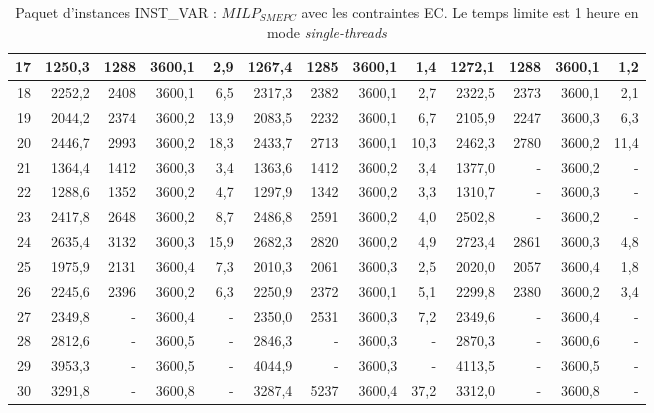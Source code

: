 {\begin{table}[H]
\begin{tabular}{|r|rrrr|rrrr|rrrr|}
		17	&	1250,3	&	1288	&	3600,1	&	2,9	&	1267,4	&	1285	&	3600,1	&	1,4	&	1272,1	&	1288	&	3600,1	&	1,2	\\ \hline
		18	&	2252,2	&	2408	&	3600,1	&	6,5	&	2317,3	&	2382	&	3600,1	&	2,7	&	2322,5	&	2373	&	3600,1	&	2,1	\\ \hline
		19	&	2044,2	&	2374	&	3600,2	&	13,9	&	2083,5	&	2232	&	3600,1	&	6,7	&	2105,9	&	2247	&	3600,3	&	6,3	\\ \hline
		20	&	2446,7	&	2993	&	3600,2	&	18,3	&	2433,7	&	2713	&	3600,1	&	10,3	&	2462,3	&	2780	&	3600,2	&	11,4	\\ \hline
		21	&	1364,4	&	1412	&	3600,3	&	3,4	&	1363,6	&	1412	&	3600,2	&	3,4	&	1377,0	&	-	&	3600,2	&	-	\\ \hline
		22	&	1288,6	&	1352	&	3600,2	&	4,7	&	1297,9	&	1342	&	3600,2	&	3,3	&	1310,7	&	-	&	3600,3	&	-	\\ \hline
		23	&	2417,8	&	2648	&	3600,2	&	8,7	&	2486,8	&	2591	&	3600,2	&	4,0	&	2502,8	&	-	&	3600,2	&	-	\\ \hline
		24	&	2635,4	&	3132	&	3600,3	&	15,9	&	2682,3	&	2820	&	3600,2	&	4,9	&	2723,4	&	2861	&	3600,3	&	4,8	\\ \hline
		25	&	1975,9	&	2131	&	3600,4	&	7,3	&	2010,3	&	2061	&	3600,3	&	2,5	&	2020,0	&	2057	&	3600,4	&	1,8	\\ \hline
		26	&	2245,6	&	2396	&	3600,2	&	6,3	&	2250,9	&	2372	&	3600,1	&	5,1	&	2299,8	&	2380	&	3600,2	&	3,4	\\ \hline
		27	&	2349,8	&	-	&	3600,4	&	-	&	2350,0	&	2531	&	3600,3	&	7,2	&	2349,6	&	-	&	3600,4	&	-	\\ \hline
		28	&	2812,6	&	-	&	3600,5	&	-	&	2846,3	&	-	&	3600,3	&	-	&	2870,3	&	-	&	3600,6	&	-	\\ \hline
		29	&	3953,3	&	-	&	3600,5	&	-	&	4044,9	&	-	&	3600,3	&	-	&	4113,5	&	-	&	3600,5	&	-	\\ \hline
		30	&	3291,8	&	-	&	3600,8	&	-	&	3287,4	&	5237	&	3600,4	&	37,2	&	3312,0	&	-	&	3600,8	&	-	\\ \hline
		
		\bottomrule
	\end{tabular}%
	\caption[Résultats de $MILP_{SMEPC}$ enrichi de EC sur INST\_VAR. Le temps limite est 1 heure en mode \textit{single-threads}]{Paquet d'instances INST\_VAR : $MILP_{SMEPC}$ avec les contraintes EC. Le temps limite est 1 heure en mode \textit{single-threads}}
	
	\label{tab:champEC}%
\end{table}%


}

